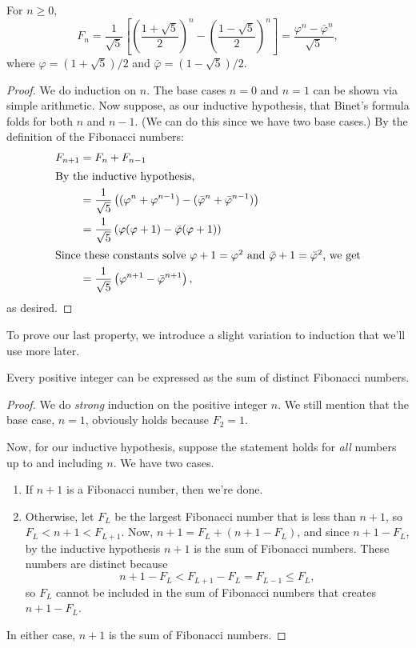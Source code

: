 \documentclass[../m055main.tex]{subfiles}
\begin{document}
\begin{theorem}
    For $n \geq 0$,
    \[ F_n = \frac{1}{\sqrt{5}} \left[ \left( \frac{1 + \sqrt{5}}{2} \right)^{n} - \left( \frac{1 - \sqrt{5}}{2} \right)^{n} \right] = \frac{\varphi^{n} - \bar{\varphi}^{n}}{\sqrt{5}}, \]
    where $\varphi = (1 + \sqrt{5}) / 2$ and $\bar{\varphi} = (1 - \sqrt{5}) / 2$.
\end{theorem}

\begin{proof}
    We do induction on $n$.
    The base cases $n=0$ and $n=1$ can be shown via simple arithmetic.
    Now suppose, as our inductive hypothesis, that Binet's formula folds for both $n$ and $n-1$.
    (We can do this since we have two base cases.)
    By the definition of the Fibonacci numbers:
    \begin{align*}
        F_{n+1} &= F_n + F_{n-1} \\
        \intertext{By the inductive hypothesis,}
        &= \frac{1}{\sqrt{5}} \left( (\varphi^{n} + \varphi^{n-1}) - (\bar{\varphi}^{n} + \bar{\varphi}^{n-1}) \right) \\
        &= \frac{1}{\sqrt{5}} \left( \varphi (\varphi + 1) - \bar{\varphi}({\varphi} + 1) \right) \\
        \intertext{Since these constants solve $\varphi + 1 = \varphi^2$ and $\bar{\varphi} + 1 = \bar{\varphi}^2$, we get}
        &= \frac{1}{\sqrt{5}} \left( \varphi^{n+1} - \bar{\varphi}^{n+1} \right),
    \end{align*}
    as desired.
\end{proof}

To prove our last property, we introduce a slight variation to induction that we'll use more later.

\begin{theorem}
    Every positive integer can be expressed as the sum of distinct Fibonacci numbers.
\end{theorem}

\begin{proof}
    We do \textit{strong} induction on the positive integer $n$.
    We still mention that the base case, $n=1$, obviously holds because $F_2 = 1$.

    Now, for our inductive hypothesis, suppose the statement holds for \textit{all} numbers up to and including $n$.
    We have two cases.
    \begin{enumerate}[label=(\alph*)]
        \item If $n+1$ is a Fibonacci number, then we're done.
        \item Otherwise, let $F_L$ be the largest Fibonacci number that is less than $n+1$, so $F_L < n+1 < F_{L+1}$.
        Now, $n+1 = F_L + (n+1 - F_L)$, and since $n + 1 - F_L$, by the inductive hypothesis $n+1$ is the sum of Fibonacci numbers.
        These numbers are distinct because
        \[ n+1 - F_L < F_{L+1} - F_L = F_{L-1} \leq F_L, \]
        so $F_L$ cannot be included in the sum of Fibonacci numbers that creates $n+1 - F_L$.
    \end{enumerate}
    In either case, $n+1$ is the sum of Fibonacci numbers.
\end{proof}
\end{document}
